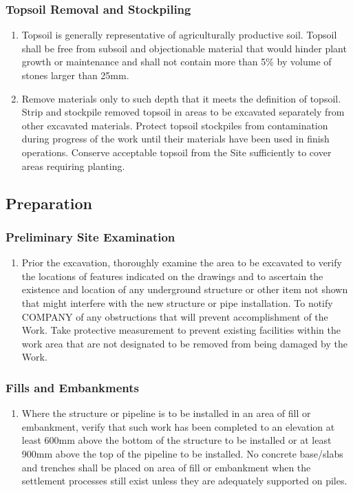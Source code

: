 \documentclass{article}%
\begin{document}
%
\subsubsection{Topsoil Removal and Stockpiling}%
\label{ssubsec:TopsoilRemovalandStockpiling}%
\begin{enumerate}[label=\alph*),start=1]%
\item%
Topsoil is generally representative of agriculturally productive  soil. Topsoil shall be free from subsoil and objectionable material that would hinder plant growth or maintenance and shall not contain more than 5\% by volume of stones larger than 25mm.%
\item%
Remove materials only to such depth that it meets the definition of topsoil. Strip and stockpile removed topsoil in areas to be excavated separately from other excavated materials. Protect topsoil stockpiles from contamination during progress of the work until their materials have been used in finish operations. Conserve acceptable topsoil from the Site sufficiently to cover areas requiring planting.%
\end{enumerate}

%
\subsection{Preparation}%
\label{subsec:Preparation}%
\subsubsection{Preliminary Site Examination}%
\label{ssubsec:PreliminarySiteExamination}%
\begin{enumerate}[label=\alph*),start=1]%
\item%
Prior the excavation, thoroughly examine the area to be excavated to verify the locations of features indicated on the drawings and to ascertain the existence and location of any underground structure or other item not shown that might interfere with the new structure or pipe installation. To notify COMPANY of any obstructions that will prevent accomplishment of the Work. Take protective measurement to prevent existing facilities within the work area that are not designated to be removed from being damaged by the Work.%
\end{enumerate}

%
\subsubsection{Fills and Embankments}%
\label{ssubsec:FillsandEmbankments}%
\begin{enumerate}[label=\alph*),start=1]%
\item%
Where the structure or pipeline is to be installed in an area of fill or embankment, verify that such work has been completed to an elevation at least 600mm above the bottom of the structure to be installed or at least 900mm above the top of the pipeline to be installed. No concrete base/slabs and trenches shall be placed on area of fill or embankment when the settlement processes still exist unless they are adequately supported on piles.%
\end{enumerate}
\end{document}
